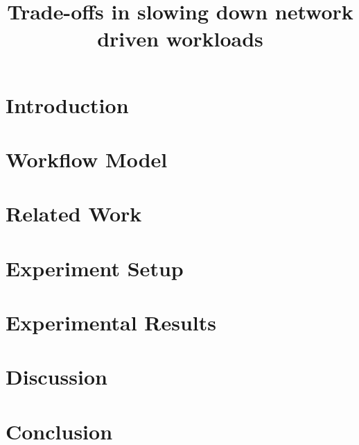 \documentclass[sigplan,10pt]{acmart}
\begin{document}
\title{Trade-offs in slowing down network driven workloads}


\maketitle
\pagestyle{plain} %

\section{Introduction}


\section{Workflow Model}

\section{Related Work}


\section{Experiment Setup}


\section{Experimental Results}




\section{Discussion}


\section{Conclusion}



\end{document}
